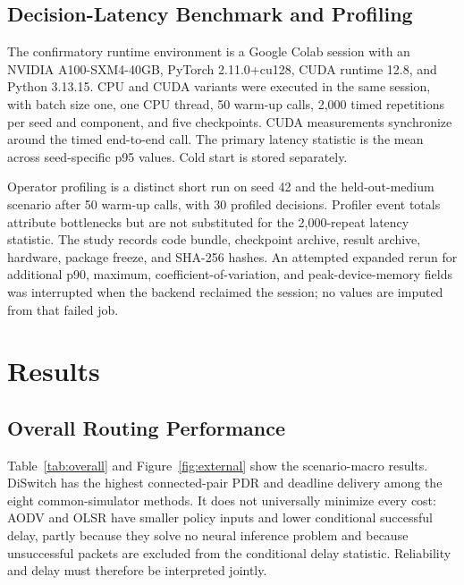 \documentclass{ieeeaccess}
\newcommand{\DS}{DiSwitch}
\begin{document}
\subsection{Decision-Latency Benchmark and Profiling}

The confirmatory runtime environment is a Google Colab session with an NVIDIA A100-SXM4-40GB, PyTorch 2.11.0+cu128, CUDA runtime 12.8, and Python 3.13.15. CPU and CUDA variants were executed in the same session, with batch size one, one CPU thread, 50 warm-up calls, 2,000 timed repetitions per seed and component, and five checkpoints. CUDA measurements synchronize around the timed end-to-end call. The primary latency statistic is the mean across seed-specific p95 values. Cold start is stored separately.

Operator profiling is a distinct short run on seed 42 and the held-out-medium scenario after 50 warm-up calls, with 30 profiled decisions. Profiler event totals attribute bottlenecks but are not substituted for the 2,000-repeat latency statistic. The study records code bundle, checkpoint archive, result archive, hardware, package freeze, and SHA-256 hashes. An attempted expanded rerun for additional p90, maximum, coefficient-of-variation, and peak-device-memory fields was interrupted when the backend reclaimed the session; no values are imputed from that failed job.

\section{Results}

\subsection{Overall Routing Performance}

Table~\ref{tab:overall} and Figure~\ref{fig:external} show the scenario-macro results. \DS{} has the highest connected-pair PDR and deadline delivery among the eight common-simulator methods. It does not universally minimize every cost: AODV and OLSR have smaller policy inputs and lower conditional successful delay, partly because they solve no neural inference problem and because unsuccessful packets are excluded from the conditional delay statistic. Reliability and delay must therefore be interpreted jointly.
\end{document}
